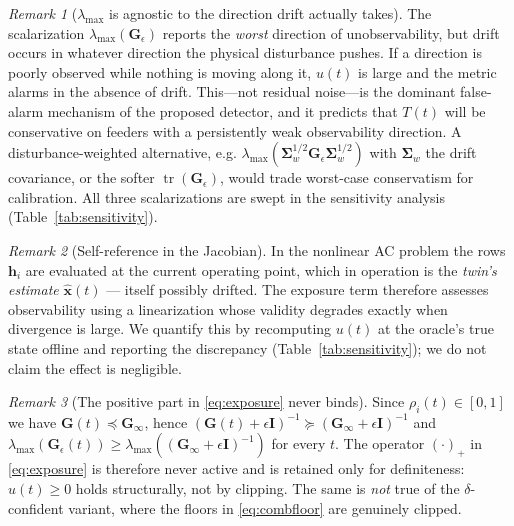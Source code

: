 \documentclass[journal]{IEEEtran}
\theoremstyle{plain}
\theoremstyle{definition}
\theoremstyle{remark}
\newtheorem{remark}{Remark}
\newcommand{\bxh}{\hat{\mathbf{x}}}
\newcommand{\bh}{\mathbf{h}}
\newcommand{\bG}{\mathbf{G}}
\newcommand{\bI}{\mathbf{I}}
\newcommand{\lmax}{\lambda_{\max}}
\newcommand{\bSigma}{\boldsymbol{\Sigma}}
\begin{document}
\begin{remark}[$\lmax$ is agnostic to the direction drift actually takes]
\label{rem:direction}
The scalarization $\lmax(\bG_{\epsilon})$ reports the \emph{worst}
direction of unobservability, but drift occurs in whatever direction the
physical disturbance pushes. If a direction is poorly observed while
nothing is moving along it, $u(t)$ is large and the metric alarms in the
absence of drift. This---not residual noise---is the dominant
false-alarm mechanism of the proposed detector, and it predicts that
$T(t)$ will be conservative on feeders with a persistently weak
observability direction. A disturbance-weighted alternative, e.g.
$\lmax(\bSigma_{w}^{1/2}\bG_{\epsilon}\bSigma_{w}^{1/2})$ with
$\bSigma_{w}$ the drift covariance, or the softer
$\operatorname{tr}(\bG_{\epsilon})$, would trade worst-case conservatism
for calibration. All three scalarizations are swept in the sensitivity
analysis (Table~\ref{tab:sensitivity}).
\end{remark}

\begin{remark}[Self-reference in the Jacobian]
\label{rem:jacobian}
In the nonlinear AC problem the rows $\bh_i$ are evaluated at the current
operating point, which in operation is the \emph{twin's estimate}
$\bxh(t)$ --- itself possibly drifted. The exposure term therefore assesses
observability using a linearization whose validity degrades exactly when
divergence is large. We quantify this by recomputing $u(t)$ at the oracle's
true state offline and reporting the discrepancy
(Table~\ref{tab:sensitivity}); we do not claim the effect is negligible.
\end{remark}

\begin{remark}[The positive part in \eqref{eq:exposure} never binds]
\label{rem:posvacuous}
Since $\rho_i(t)\in[0,1]$ we have $\bG(t)\preceq\bG_{\infty}$, hence
$(\bG(t)+\epsilon\bI)^{-1}\succeq(\bG_{\infty}+\epsilon\bI)^{-1}$ and
$\lmax(\bG_{\epsilon}(t))\ge\lmax((\bG_{\infty}+\epsilon\bI)^{-1})$ for
every $t$. The operator $(\cdot)_{+}$ in \eqref{eq:exposure} is therefore
never active and is retained only for definiteness: $u(t)\ge0$ holds
structurally, not by clipping. The same is \emph{not} true of the
$\delta$-confident variant, where the floors in \eqref{eq:combfloor} are
genuinely clipped.
\end{remark}
\end{document}
